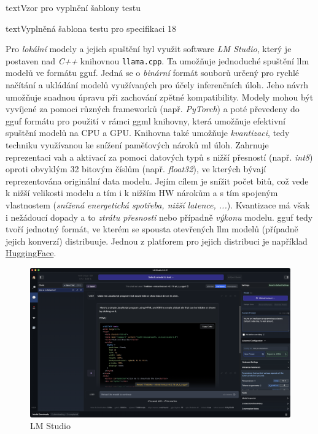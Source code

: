\documentclass[czech, ma, kiv, he, iso690numb, pdf, viewonly]{fasthesis}
\begin{document}
\begin{code}{text}{Vzor pro vyplnění šablony testu \label{lst:template}}
{\begin{code}{text}{Vyplněná šablona testu pro specifikaci 18 \label{lst:spec18}}
{            Pro \emph{lokální} modely a jejich spuštění byl využit software \textit{LM Studio}, který je postaven nad \textit{C++} knihovnou \verb|llama.cpp|. Ta umožňuje jednoduché spuštění \Gls{llm} modelů ve formátu \acrfull{gguf}. Jedná se o \textit{binární} formát souborů určený pro rychlé načítání a ukládání modelů využívaných pro účely inferenčních úloh. Jeho návrh umožňuje snadnou úpravu při zachování zpětné kompatibility. \cite{ggerganov_gguf} \cite{huggingface_gguf} Modely mohou být vyvíjené za pomoci různých frameworků (např. \textit{PyTorch}) a poté převedeny do \acrshort{gguf} formátu pro použití v rámci \acrshort{ggml} knihovny, která umožňuje efektivní spuštění modelů na CPU a GPU. Knihovna také umožňuje \emph{kvantizaci}, tedy techniku využívanou ke snížení paměťových nároků \acrshort{ml} úloh. Zahrnuje reprezentaci vah a aktivací za pomoci datových typů s nižší přesností (např. \textit{int8}) oproti obvyklým 32 bitovým číslům (např. \textit{float32}), ve kterých bývají reprezentována originální data modelu. Jejím cílem je snížit počet bitů, což vede k nižší velikosti modelu a tím i k nižším HW nárokům a s tím spojeným vlastnostem (\textit{snížená energetická spotřeba, nižší latence, ...}). Kvantizace má však i nežádoucí dopady a to \textit{ztrátu přesnosti} nebo případně \textit{výkonu} modelu. \cite{huggingface_quantization} \Acrshort{gguf} tedy tvoří jednotný formát, ve kterém se spousta otevřených \Gls{llm} modelů (případně jejich konverzí) distribuuje. Jednou z platforem pro jejich distribuci je například \href{https://huggingface.co}{HuggingFace}.

            \begin{figure}
                \includegraphics[width=\textwidth]{pic/lm_studio.png}
                \centering
                \caption{LM Studio}
                \label{fig:lm_studio}
            \end{figure}

}
\end{code}}
\end{code}
\end{document}
